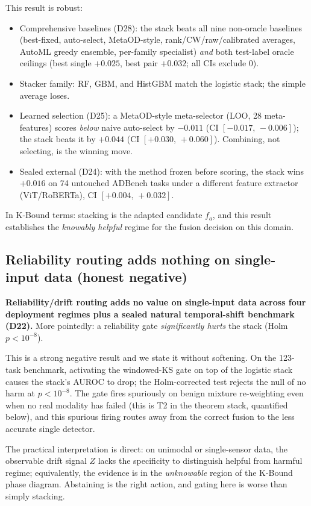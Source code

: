 This result is robust:
\begin{itemize}
\item Comprehensive baselines (D28): the stack beats all nine non-oracle baselines
  (best-fixed, auto-select, MetaOD-style, rank/CW/raw/calibrated averages, AutoML
  greedy ensemble, per-family specialist) \emph{and} both test-label oracle
  ceilings (best single $+0.025$, best pair $+0.032$; all CIs exclude 0).
\item Stacker family: RF, GBM, and HistGBM match the logistic stack; the simple
  average loses.
\item Learned selection (D25): a MetaOD-style meta-selector (LOO, 28 meta-features)
  scores \emph{below} naive auto-select by $-0.011$ (CI $[-0.017,\, -0.006]$);
  the stack beats it by $+0.044$ (CI $[+0.030,\, +0.060]$).  Combining, not
  selecting, is the winning move.
\item Sealed external (D24): with the method frozen before scoring, the stack wins
  $+0.016$ on 74 untouched ADBench tasks under a different feature extractor
  (ViT/RoBERTa), CI $[+0.004,\, +0.032]$.
\end{itemize}

In K-Bound terms: stacking is the adapted candidate $f_a$, and this result establishes
the \emph{knowably helpful} regime for the fusion decision on this domain.

\subsection{Reliability routing adds nothing on single-input data (honest negative)}\label{sec:elara-routing-neg}

\textbf{Reliability/drift routing adds no value on single-input data across four
deployment regimes plus a sealed natural temporal-shift benchmark (D22).}  More
pointedly: a reliability gate \emph{significantly hurts} the stack (Holm $p < 10^{-8}$).

This is a strong negative result and we state it without softening.  On the 123-task
benchmark, activating the windowed-KS gate on top of the logistic stack causes the
stack's AUROC to drop; the Holm-corrected test rejects the null of no harm at
$p < 10^{-8}$.  The gate fires spuriously on benign mixture re-weighting even when
no real modality has failed (this is T2 in the theorem stack, quantified below), and
this spurious firing routes away from the correct fusion to the less accurate single
detector.

The practical interpretation is direct: on unimodal or single-sensor data, the
observable drift signal $Z$ lacks the specificity to distinguish helpful from harmful
regime; equivalently, the evidence is in the \emph{unknowable} region of the K-Bound
phase diagram.  Abstaining is the right action, and gating here is worse than
simply stacking.


